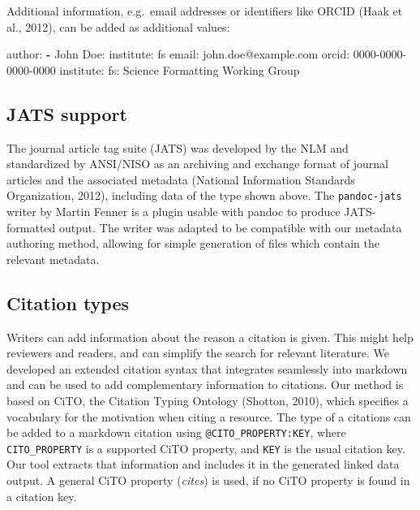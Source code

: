 \documentclass[10pt,fleqn]{wlpeerj}
\newenvironment{Shaded}{}{}
\newcommand{\KeywordTok}[1]{\textcolor[rgb]{0.00,0.44,0.13}{\textbf{{#1}}}}
\newcommand{\FunctionTok}[1]{\textcolor[rgb]{0.02,0.16,0.49}{{#1}}}
\newcommand{\NormalTok}[1]{{#1}}
\begin{document}
Additional information, e.g.~email addresses or identifiers like ORCID
(Haak et al., 2012), can be added as additional values:

\begin{Shaded}
\begin{Highlighting}[]
\FunctionTok{author:}
  \KeywordTok{-} \FunctionTok{John Doe:}
      \FunctionTok{institute:} \NormalTok{fs}
      \FunctionTok{email:} \NormalTok{john.doe@example.com}
      \FunctionTok{orcid:} \NormalTok{0000-0000-0000-0000}
\FunctionTok{institute:}
  \FunctionTok{fs:} \NormalTok{Science Formatting Working Group}
\end{Highlighting}
\end{Shaded}

\subsection{JATS support}\label{jats-support}

The journal article tag suite (JATS) was developed by the NLM and
standardized by ANSI/NISO as an archiving and exchange format of journal
articles and the associated metadata (National Information Standards
Organization, 2012), including data of the type shown above. The
\texttt{pandoc-jats} writer by Martin Fenner is a plugin usable with
pandoc to produce JATS-formatted output. The writer was adapted to be
compatible with our metadata authoring method, allowing for simple
generation of files which contain the relevant metadata.

\subsection{Citation types}\label{citation-types}

Writers can add information about the reason a citation is given. This
might help reviewers and readers, and can simplify the search for
relevant literature. We developed an extended citation syntax that
integrates seamlessly into markdown and can be used to add complementary
information to citations. Our method is based on CiTO, the Citation
Typing Ontology (Shotton, 2010), which specifies a vocabulary for the
motivation when citing a resource. The type of a citations can be added
to a markdown citation using \texttt{@CITO\_PROPERTY:KEY}, where
\texttt{CITO\_PROPERTY} is a supported CiTO property, and \texttt{KEY}
is the usual citation key. Our tool extracts that information and
includes it in the generated linked data output. A general CiTO property
(\emph{cites}) is used, if no CiTO property is found in a citation key.
\end{document}
